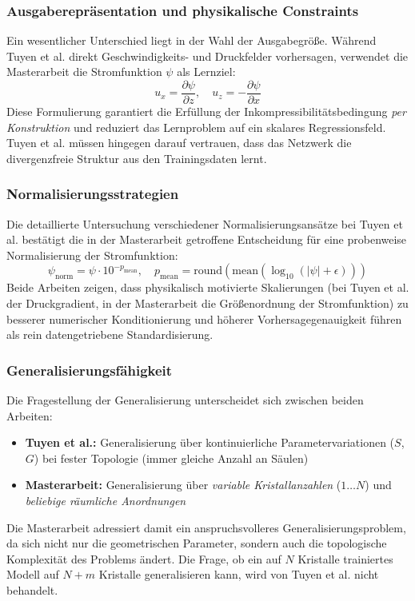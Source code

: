 \documentclass[a4paper,12pt]{article}
\begin{document}
\subsubsection*{Ausgaberepräsentation und physikalische Constraints}

Ein wesentlicher Unterschied liegt in der Wahl der Ausgabegröße. Während Tuyen et al. direkt Geschwindigkeits- und Druckfelder vorhersagen, verwendet die Masterarbeit die Stromfunktion $\psi$ als Lernziel:
\[
u_x = \frac{\partial \psi}{\partial z}, \quad u_z = -\frac{\partial \psi}{\partial x}
\]
Diese Formulierung garantiert die Erfüllung der Inkompressibilitätsbedingung \emph{per Konstruktion} und reduziert das Lernproblem auf ein skalares Regressionsfeld. Tuyen et al. müssen hingegen darauf vertrauen, dass das Netzwerk die divergenzfreie Struktur aus den Trainingsdaten lernt.

\subsubsection*{Normalisierungsstrategien}

Die detaillierte Untersuchung verschiedener Normalisierungsansätze bei Tuyen et al. bestätigt die in der Masterarbeit getroffene Entscheidung für eine probenweise Normalisierung der Stromfunktion:
\[
\psi_{\text{norm}} = \psi \cdot 10^{-p_{\text{mean}}}, \quad p_{\text{mean}} = \text{round}(\text{mean}(\log_{10}(|\psi| + \epsilon)))
\]
Beide Arbeiten zeigen, dass physikalisch motivierte Skalierungen (bei Tuyen et al. der Druckgradient, in der Masterarbeit die Größenordnung der Stromfunktion) zu besserer numerischer Konditionierung und höherer Vorhersagegenauigkeit führen als rein datengetriebene Standardisierung.

\subsubsection*{Generalisierungsfähigkeit}

Die Fragestellung der Generalisierung unterscheidet sich zwischen beiden Arbeiten:
\begin{itemize}
    \item \textbf{Tuyen et al.:} Generalisierung über kontinuierliche Parametervariationen ($S$, $G$) bei fester Topologie (immer gleiche Anzahl an Säulen)
    \item \textbf{Masterarbeit:} Generalisierung über \emph{variable Kristallanzahlen} ($1 \ldots N$) und \emph{beliebige räumliche Anordnungen}
\end{itemize}
Die Masterarbeit adressiert damit ein anspruchsvolleres Generalisierungsproblem, da sich nicht nur die geometrischen Parameter, sondern auch die topologische Komplexität des Problems ändert. Die Frage, ob ein auf $N$ Kristalle trainiertes Modell auf $N+m$ Kristalle generalisieren kann, wird von Tuyen et al. nicht behandelt.
\end{document}
